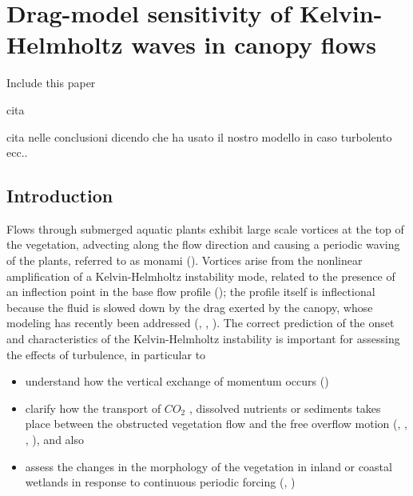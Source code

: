 \chapter{Drag-model sensitivity of Kelvin-Helmholtz waves in canopy flows}
\label{ch:stability}


\citet{segura2017permeable} 

Include this paper \citet{sharma2017stabilitycanopy}

cita \citet{ortiz2002spatial}


cita \citet{garcia2017analysis} nelle conclusioni dicendo che ha usato il nostro modello in caso turbolento ecc..

\section{Introduction}




Flows through submerged aquatic plants exhibit large scale vortices at the top of the vegetation,
advecting along the flow direction and causing a periodic waving of the plants, referred to as
monami (\citet{ackerman1993reduced}).  Vortices arise from the nonlinear amplification of a Kelvin-Helmholtz instability mode,
related to the presence of an inflection point in the base flow profile (\citet{asaeda2005morphological}); the profile itself is inflectional
because the fluid is slowed down by the drag exerted by the canopy, whose modeling has recently
been addressed (\citet{py2004mixing}, \citet{singh2016linear}, \citet{zampogna2016instability}). The correct prediction of the onset and characteristics of the Kelvin-Helmholtz
instability is important for assessing the effects of turbulence, in particular to
\begin{itemize}
	\item  understand how the vertical exchange of momentum occurs (\citet{ikeda1996three})
	\item clarify how the transport of $CO_2$ , dissolved nutrients or sediments takes place between the
	obstructed vegetation flow and the free overflow motion (\citet{gambi1990flume}, \citet{eckman1987role}, \citet{grizzle1996hydrodynamically}, \citet{finnigan2000turbulence}), and also
	\item assess the changes in the morphology of the vegetation in inland or coastal wetlands in
	response to continuous periodic forcing (\citet{asaeda2005morphological}, \citet{patil2010characteristics})
\end{itemize}

